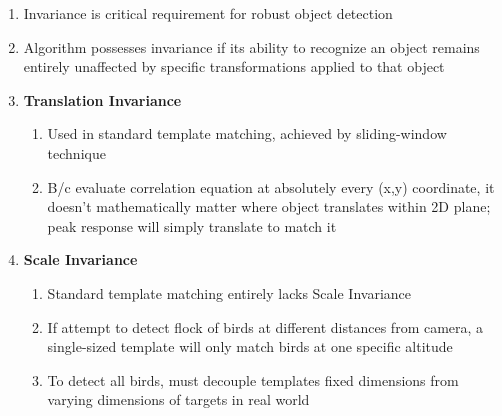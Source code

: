 \documentclass[12pt]{article}
\begin{document}
\begin{enumerate}
    \item Invariance is critical requirement for robust object detection
    \item Algorithm possesses invariance if its ability to recognize an object remains entirely unaffected by specific transformations applied to that object
    \item \textbf{Translation Invariance}
          \begin{enumerate}
              \item Used in standard template matching, achieved by sliding-window technique
              \item B/c evaluate correlation equation at absolutely every (x,y) coordinate, it doesn't mathematically matter where object translates within 2D plane; peak response will simply translate to match it
          \end{enumerate}
    \item \textbf{Scale Invariance}
          \begin{enumerate}
              \item Standard template matching entirely lacks Scale Invariance
              \item If attempt to detect flock of birds at different distances from camera, a single-sized template will only match birds at one specific altitude
              \item To detect all birds, must decouple templates fixed dimensions from varying dimensions of targets in real world
          \end{enumerate}


\end{enumerate}
\end{document}
